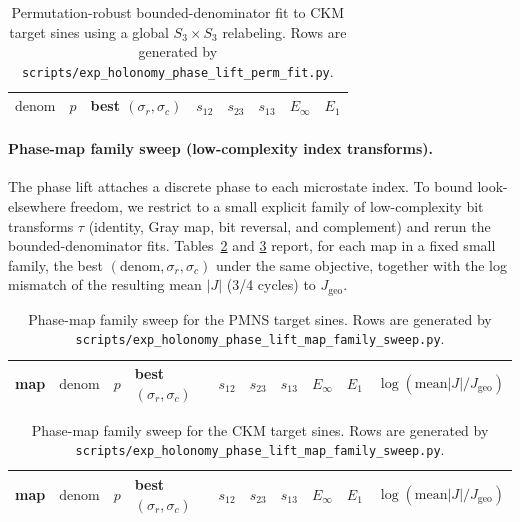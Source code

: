 \begin{table}[t]
\centering
\scriptsize
\setlength{\tabcolsep}{4pt}
\renewcommand{\arraystretch}{1.15}
\begin{tabular}{rrrrrrrr}
\toprule
$\mathrm{denom}$ & $p$ & best $(\sigma_r,\sigma_c)$ & $s_{12}$ & $s_{23}$ & $s_{13}$ & $E_\infty$ & $E_1$ \\
\midrule
%
\end{tabular}
\caption{Permutation-robust bounded-denominator fit to CKM target sines using a global $S_3\times S_3$ relabeling. Rows are generated by \texttt{scripts/exp\_holonomy\_phase\_lift\_perm\_fit.py}.}
\label{tab:holonomy_perm_fit_ckm}
\end{table}

\paragraph{Phase-map family sweep (low-complexity index transforms).}
The phase lift attaches a discrete phase to each microstate index.
To bound look-elsewhere freedom, we restrict to a small explicit family of low-complexity bit transforms $\tau$ (identity, Gray map, bit reversal, and complement) and rerun the bounded-denominator fits.
Tables~\ref{tab:holonomy_map_family_pmns} and \ref{tab:holonomy_map_family_ckm} report, for each map in a fixed small family, the best $(\mathrm{denom},\sigma_r,\sigma_c)$ under the same objective, together with the log mismatch of the resulting mean $|J|$ (3/4 cycles) to $J_{\mathrm{geo}}$.

\begin{table}[t]
\centering
\scriptsize
\setlength{\tabcolsep}{4pt}
\renewcommand{\arraystretch}{1.15}
\begin{tabular}{lrrlrrrrrr}
\toprule
map & $\mathrm{denom}$ & $p$ & best $(\sigma_r,\sigma_c)$ & $s_{12}$ & $s_{23}$ & $s_{13}$ & $E_\infty$ & $E_1$ & $\log(\mathrm{mean}|J|/J_{\mathrm{geo}})$ \\
\midrule
%
\end{tabular}
\caption{Phase-map family sweep for the PMNS target sines. Rows are generated by \texttt{scripts/exp\_holonomy\_phase\_lift\_map\_family\_sweep.py}.}
\label{tab:holonomy_map_family_pmns}
\end{table}

\begin{table}[t]
\centering
\scriptsize
\setlength{\tabcolsep}{4pt}
\renewcommand{\arraystretch}{1.15}
\begin{tabular}{lrrlrrrrrr}
\toprule
map & $\mathrm{denom}$ & $p$ & best $(\sigma_r,\sigma_c)$ & $s_{12}$ & $s_{23}$ & $s_{13}$ & $E_\infty$ & $E_1$ & $\log(\mathrm{mean}|J|/J_{\mathrm{geo}})$ \\
\midrule
%
\end{tabular}
\caption{Phase-map family sweep for the CKM target sines. Rows are generated by \texttt{scripts/exp\_holonomy\_phase\_lift\_map\_family\_sweep.py}.}
\label{tab:holonomy_map_family_ckm}
\end{table}

